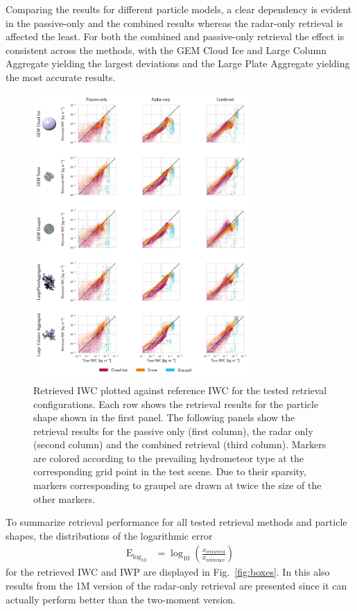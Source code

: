 \documentclass[journal abbreviation, manuscript]{copernicus}
\begin{document}
Comparing the results for different particle models, a clear dependency is
evident in the passive-only and the combined results whereas the radar-only
retrieval is affected the least. For both the combined and passive-only
retrieval the effect is consistent across the methods, with the GEM Cloud Ice
and Large Column Aggregate yielding the largest deviations and the Large Plate
Aggregate yielding the most accurate results.

\begin{figure}
\centering \includegraphics[width = 0.75\textwidth]{../plots/results_scatter_a}
\caption{Retrieved IWC plotted against reference IWC for the tested retrieval
  configurations. Each row shows the retrieval results for the particle shape
  shown in the first panel. The following panels show the retrieval results for
  the passive only (first column), the radar only (second column) and the
  combined retrieval (third column). Markers are colored according to the
  prevailing hydrometeor type at the corresponding grid point in the test
  scene. Due to their sparsity, markers corresponding to graupel are drawn at
  twice the size of the other markers.}
\label{fig:results_scatter_a}
\end{figure}



To summarize retrieval performance for all tested retrieval methods and particle
shapes, the distributions of the logarithmic error
\begin{align}
  \text{E}_{\text{log}_{10}} &= \log_\text{10} \left
  (\frac{x_\text{retrieved}}{x_\text{reference}} \right )
\end{align}
for the retrieved IWC and IWP are displayed in Fig.~\ref{fig:boxes}. In this
also results from the 1M version of the radar-only retrieval are presented since
it can actually perform better than the two-moment version.
\end{document}
